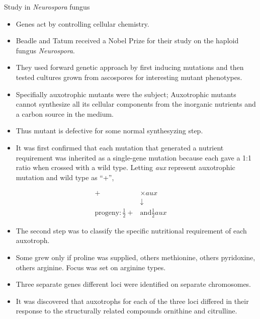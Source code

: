 \documentclass[11pt,dvipsnames,ignorenonframetext,aspectratio=169]{beamer}
\providecommand{\tightlist}{%
  \setlength{\itemsep}{0pt}\setlength{\parskip}{0pt}}
\begin{document}
\begin{frame}{Study in \emph{Neurospora} fungus}
\protect\hypertarget{study-in-neurospora-fungus}{}
\begin{itemize}
\tightlist
\item
  Genes act by controlling cellular chemistry.
\item
  Beadle and Tatum received a Nobel Prize for their study on the haploid
  fungus \emph{Neurospora}.
\item
  They used forward genetic approach by first inducing mutations and
  then tested cultures grown from ascospores for interesting mutant
  phenotypes.
\item
  Specifially auxotrophic mutants were the subject; Auxotrophic mutants
  cannot synthesize all its cellular components from the inorganic
  nutrients and a carbon source in the medium.
\item
  Thus mutant is defective for some normal synthesyzing step.
\end{itemize}
\end{frame}

\begin{frame}{}
\protect\hypertarget{section-6}{}
\begin{itemize}
\tightlist
\item
  It was first confirmed that each mutation that generated a nutrient
  requirement was inherited as a single-gene mutation because each gave
  a 1:1 ratio when crossed with a wild type. Letting \emph{aux}
  represent auxotrophic mutation and wild type as ``+'',
\end{itemize}

\[
\begin{aligned}
+ &\times aux \\
 &\downarrow\\
\textrm{progeny}: \frac{1}{2} + &\textrm{and} \frac{1}{2}aux
\end{aligned}
\]

\begin{itemize}
\tightlist
\item
  The second step was to classify the specific nutritional requirement
  of each auxotroph.
\item
  Some grew only if proline was supplied, others methionine, others
  pyridoxine, others arginine. Focus was set on arginine types.
\item
  Three separate genes different loci were identified on separate
  chromosomes.
\item
  It was discovered that auxotrophs for each of the three loci differed
  in their response to the structurally related compounds ornithine and
  citrulline.
\end{itemize}
\end{frame}
\end{document}
